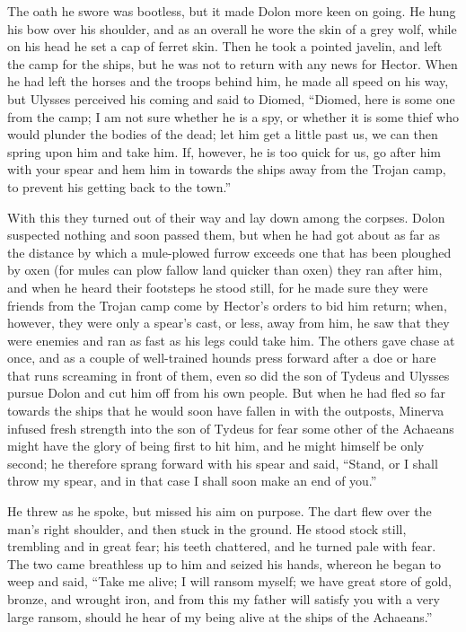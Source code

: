 The oath he swore was bootless, but it made Dolon more keen on going. He
hung his bow over his shoulder, and as an overall he wore the skin of a
grey wolf, while on his head he set a cap of ferret skin. Then he took a
pointed javelin, and left the camp for the ships, but he was not to return
with any news for Hector. When he had left the horses and the troops
behind him, he made all speed on his way, but Ulysses perceived his coming
and said to Diomed, “Diomed, here is some one from the camp; I am not sure
whether he is a spy, or whether it is some thief who would plunder the
bodies of the dead; let him get a little past us, we can then spring upon
him and take him. If, however, he is too quick for us, go after him with
your spear and hem him in towards the ships away from the Trojan camp, to
prevent his getting back to the town.”

With this they turned out of their way and lay down among the corpses.
Dolon suspected nothing and soon passed them, but when he had got about as
far as the distance by which a mule-plowed furrow exceeds one that has
been ploughed by oxen (for mules can plow fallow land quicker than oxen)
they ran after him, and when he heard their footsteps he stood still, for
he made sure they were friends from the Trojan camp come by Hector’s
orders to bid him return; when, however, they were only a spear’s cast, or
less, away from him, he saw that they were enemies and ran as fast as his
legs could take him. The others gave chase at once, and as a couple of
well-trained hounds press forward after a doe or hare that runs screaming
in front of them, even so did the son of Tydeus and Ulysses pursue Dolon
and cut him off from his own people. But when he had fled so far towards
the ships that he would soon have fallen in with the outposts, Minerva
infused fresh strength into the son of Tydeus for fear some other of the
Achaeans might have the glory of being first to hit him, and he might
himself be only second; he therefore sprang forward with his spear and
said, “Stand, or I shall throw my spear, and in that case I shall soon
make an end of you.”

He threw as he spoke, but missed his aim on purpose. The dart flew over
the man’s right shoulder, and then stuck in the ground. He stood stock
still, trembling and in great fear; his teeth chattered, and he turned
pale with fear. The two came breathless up to him and seized his hands,
whereon he began to weep and said, “Take me alive; I will ransom myself;
we have great store of gold, bronze, and wrought iron, and from this my
father will satisfy you with a very large ransom, should he hear of my
being alive at the ships of the Achaeans.”

